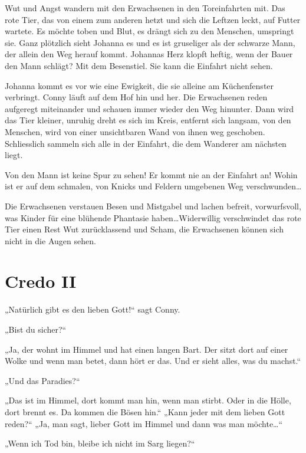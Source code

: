 \documentclass[10pt,titlepage,a5paper]{book}
\begin{document}
Wut und Angst wandern mit den Erwachsenen in den Toreinfahrten mit. Das rote Tier, das von einem zum anderen hetzt und sich die Leftzen leckt, auf Futter wartete. Es möchte toben und Blut, es drängt sich zu den Menschen, umspringt sie. Ganz plötzlich sieht Johanna es und es ist gruseliger als der schwarze Mann, der allein den Weg herauf kommt. Johannas Herz klopft heftig, wenn der Bauer den Mann schlägt? Mit dem Besenstiel. Sie kann die Einfahrt nicht sehen. 

Johanna kommt es vor wie eine Ewigkeit, die sie alleine am Küchen\-fenster verbringt. Conny läuft auf dem Hof hin und her. Die Erwachsenen reden aufgeregt miteinander und schauen immer wieder den Weg hinunter. Dann wird das  Tier kleiner, unruhig dreht es sich im Kreis, entfernt sich langsam, von den Menschen, wird von einer unsichtbaren Wand von ihnen weg geschoben.
Schliesslich sammeln sich alle in der Einfahrt, die dem Wanderer am nächsten liegt.  

Von den Mann ist keine Spur zu sehen! Er kommt nie an der Einfahrt an!
Wohin ist er auf dem schmalen, von Knicks und Feldern umgebenen Weg verschwunden\dots

Die Erwachsenen verstauen Besen und Mistgabel und lachen befreit, vorwurfsvoll, was Kinder für eine blühende Phantasie haben\dots Widerwillig verschwindet das rote Tier einen Rest Wut zu\-rück\-lassend und Scham, die Erwachsenen können sich nicht in die Augen sehen.



\section*{Credo II}



„Natürlich gibt es den lieben Gott!“ sagt Conny. 

„Bist du sicher?“

„Ja, der wohnt im Himmel und hat einen langen Bart. Der sitzt dort auf einer Wolke und wenn man betet, dann hört er das. Und er sieht alles, was du machst.“

„Und das Paradies?“  

„Das ist im Himmel, dort kommt man hin, wenn man stirbt. Oder in die Hölle, dort brennt es. Da kommen die Bösen hin.“ 
„Kann jeder mit dem lieben Gott reden?“ „Ja, man sagt, lieber Gott im Himmel und dann was man möchte\dots“


„Wenn ich Tod bin, bleibe ich nicht im Sarg liegen?“
\end{document}
